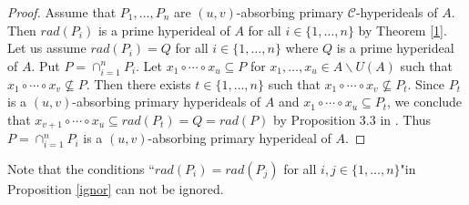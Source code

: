 \documentclass[preprint,review,10pt]{amsart}
\theoremstyle{definition}
\theoremstyle{remark}
\numberwithin{equation}{section}
\begin{document}
\begin{proof}
Assume that  $P_1, \ldots,P_n$ are $(u,v)$-absorbing primary $\mathcal{C}$-hyperideals of $A$. Then $rad(P_i)$ is a prime hyperideal of $A$ for all $i \in \{1,\ldots,n\}$ by Theorem \ref{1}. Let us assume $rad(P_i)=Q$ for all $i \in \{1,\ldots,n\}$ where $Q$ is a prime hyperideal of $A$. Put $P=\cap_{i=1}^nP_i$.  Let $x_1\circ \cdots \circ x_u \subseteq P$ for $x_1,\ldots,x_u \in A \backslash U(A)$ such that $x_1\circ \cdots \circ x_v \nsubseteq P$. Then there exists  $t \in \{1,\ldots,n\}$ such that $x_1\circ \cdots \circ x_v \nsubseteq P_t$. Since $P_t$ is a $(u,v)$-absorbing primary hyperideals of $A$ and $x_1\circ \cdots \circ x_u \subseteq P_t$, we conclude that $x_{v+1}\circ \cdots \circ x_u \subseteq rad(P_t)=Q=rad(P)$ by Proposition 3.3 in \cite{das}. Thus $P=\cap_{i=1}^nP_i$ is a $(u,v)$-absorbing primary hyperideal of $A$.
\end{proof}
Note that the conditions ``$rad(P_i)=rad(P_j)$ for all $i,j \in \{1,\ldots,n\}$"in Proposition \ref{ignor} can not be ignored.
\end{document}
